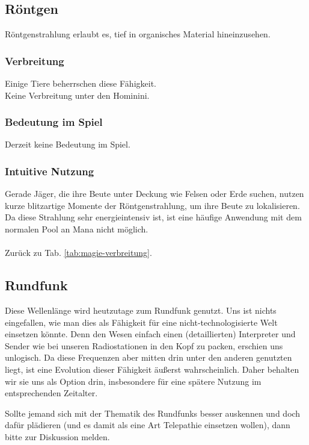 \subsection{Röntgen}\label{sec:roentgenmagie}
Röntgenstrahlung erlaubt es, tief in organisches Material hineinzusehen. 

\subsubsection{Verbreitung}
Einige Tiere beherrschen diese Fähigkeit. \\
Keine Verbreitung unter den Hominini.

\subsubsection{Bedeutung im Spiel}
Derzeit keine Bedeutung im Spiel.

\subsubsection{Intuitive Nutzung}
Gerade Jäger, die ihre Beute unter Deckung wie Felsen oder Erde suchen, nutzen kurze blitzartige Momente der Röntgenstrahlung, um ihre Beute zu lokalisieren.
Da diese Strahlung sehr energieintensiv ist, ist eine häufige Anwendung mit dem normalen Pool an Mana nicht möglich.
\\ \\
Zurück zu Tab. \ref{tab:magie-verbreitung}.



\subsection{Rundfunk}\label{sec:rundfunkmagie}
Diese Wellenlänge wird heutzutage zum Rundfunk genutzt.
Uns ist nichts eingefallen, wie man dies als Fähigkeit für eine nicht-technologisierte Welt einsetzen könnte.
Denn den Wesen einfach einen (detaillierten) Interpreter und Sender wie bei unseren Radiostationen in den Kopf zu packen, erschien uns unlogisch.
Da diese Frequenzen aber mitten drin unter den anderen genutzten liegt, ist eine Evolution dieser Fähigkeit äußerst wahrscheinlich.
Daher behalten wir sie uns als Option drin, insbesondere für eine spätere Nutzung im entsprechenden Zeitalter.

Sollte jemand sich mit der Thematik des Rundfunks besser auskennen und doch dafür plädieren (und es damit als eine Art Telepathie einsetzen wollen), dann bitte zur Diskussion melden.

